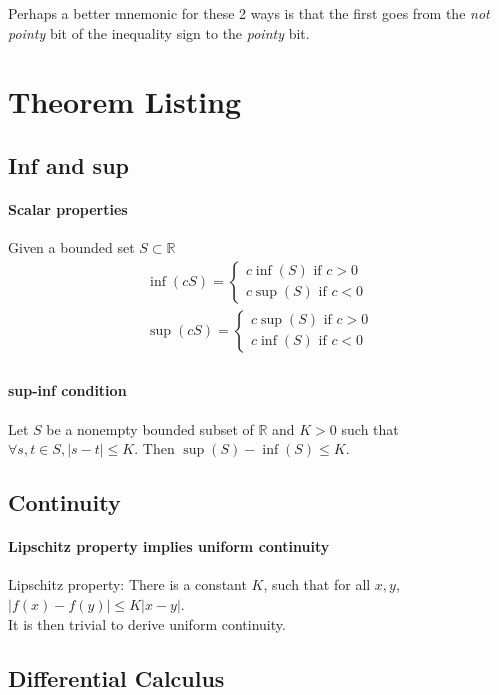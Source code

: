 \documentclass{article}
\begin{document}
Perhaps a better mnemonic for these 2 ways is that the first goes from the \textit{not pointy} bit of the inequality sign to the \textit{pointy} bit.

\section{Theorem Listing}
\subsection{Inf and sup}
\paragraph{Scalar properties}
Given a bounded set $S\subset \mathbb{R}$
\begin{align*}
\inf(cS)=
\begin{cases}
c\inf(S) \text{ if }c>0\\
c\sup(S) \text{ if }c<0
\end{cases}\\
\sup(cS)=
\begin{cases}
c\sup(S) \text{ if }c>0\\
c\inf(S) \text{ if }c<0
\end{cases}\\
\end{align*}

\paragraph{sup-inf condition}
Let $S$ be a nonempty bounded subset of $\mathbb{R}$ and $K>0$ such that $\forall s,t\in S,|s-t|\leq K$. Then $\sup(S)-\inf(S)\leq K$.

\subsection{Continuity}
\paragraph{Lipschitz property implies uniform continuity}
Lipschitz property: There is a constant $K$, such that for all $x,y$, $|f(x)-f(y)|\leq K|x-y|$.\\
It is then trivial to derive uniform continuity.

\subsection{Differential Calculus}
\end{document}

